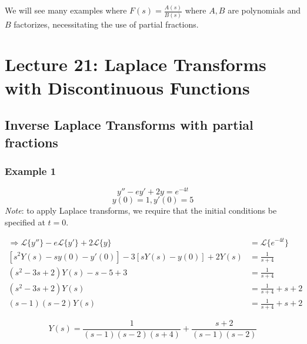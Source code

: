 \documentclass[11pt]{article}
\newcommand{\lap}{\mathcal{L}}
\begin{document}
	We will see many examples where $F(s) = \frac{A(s)}{B(s)}$ where $A,B$ are polynomials and $B$ factorizes, necessitating the use of partial fractions.

\section{Lecture 21: Laplace Transforms with Discontinuous Functions}
\subsection{Inverse Laplace Transforms with partial fractions}
\subsubsection{Example 1}
		$$ y'' - ey' + 2y = e^{-4t} $$
		$$ y(0) = 1, y'(0) = 5 $$
	\emph{Note}: to apply Laplace transforms, we require that the initial conditions be specified at $t=0$.

		\begin{align*}
			\Rightarrow \lap\{y''\} - e \lap\{y'\} + 2 \lap\{y\} &= \lap\{e^{-4t}\} \\
			[s^2 Y(s) - sy(0) - y'(0)] - 3 [sY(s) - y(0)] + 2Y(s) &= \frac{1}{s+4} \\
			(s^2 - 3s + 2)Y(s) - s - 5 + 3 &= \frac{1}{s+4} \\
			(s^2 - 3s + 2) Y(s) &= \frac{1}{s+4} + s + 2 \\
			(s-1)(s-2)Y(s) &= \frac{1}{s+4} + s + 2
		\end{align*}

		\[
			\boxed{Y(s) = \frac{1}{(s-1)(s-2)(s+4)} + \frac{s+2}{(s-1)(s-2)}}
			\tag{$\star$}
			\label{eq:partial1}
		\]
\end{document}
